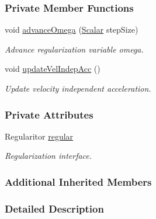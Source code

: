 \subsubsection*{Private Member Functions}
\begin{DoxyCompactItemize}
\item 
void \mbox{\hyperlink{classregu_system_3_01_newtonian_3_01typename_01_evolved_data_1_1_scalar_01_4_00_01_evolved_data_00_01_regularitor_01_4_a114c39dbc724ee6cda9f2b3da8d1ff3c}{advance\+Omega}} (\mbox{\hyperlink{classregu_system_3_01_newtonian_3_01typename_01_evolved_data_1_1_scalar_01_4_00_01_evolved_data_00_01_regularitor_01_4_a6993f135075541f441a7642845b183a5}{Scalar}} step\+Size)
\begin{DoxyCompactList}\small\item\em Advance regularization variable omega. \end{DoxyCompactList}\item 
void \mbox{\hyperlink{classregu_system_3_01_newtonian_3_01typename_01_evolved_data_1_1_scalar_01_4_00_01_evolved_data_00_01_regularitor_01_4_a90719aee4d16176e982461d1f4d2fd33}{update\+Vel\+Indep\+Acc}} ()
\begin{DoxyCompactList}\small\item\em Update velocity independent acceleration. \end{DoxyCompactList}\end{DoxyCompactItemize}
\subsubsection*{Private Attributes}
\begin{DoxyCompactItemize}
\item 
Regularitor \mbox{\hyperlink{classregu_system_3_01_newtonian_3_01typename_01_evolved_data_1_1_scalar_01_4_00_01_evolved_data_00_01_regularitor_01_4_a56f2b9c617d94ca6e1d5ae5cc97fef0f}{regular}}
\begin{DoxyCompactList}\small\item\em Regularization interface. \end{DoxyCompactList}\end{DoxyCompactItemize}
\subsubsection*{Additional Inherited Members}


\subsubsection{Detailed Description}
